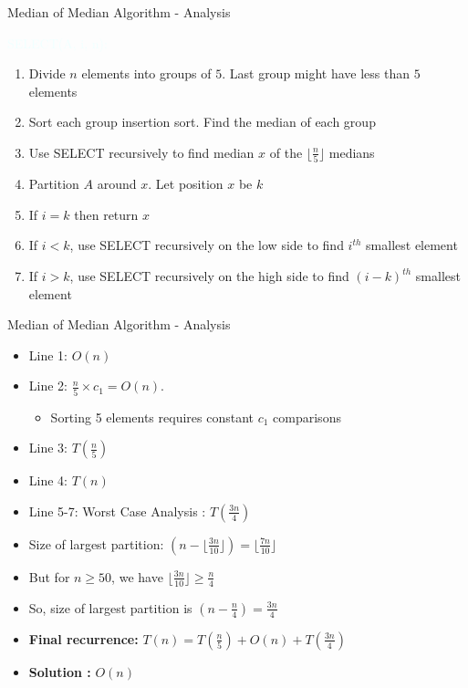\documentclass{beamer}
\newcommand{\tblue}[1]{{\Large {\textcolor{azure}{#1}}}}
\begin{document}
\begin{frame}{Median of Median Algorithm - Analysis}

\tblue{SELECT(A, i, n):}
\begin{enumerate}
    \item Divide $n$ elements into groups of $5$. Last group might have less than $5$ elements
    \item Sort each group insertion sort. Find the median of each group
    \item Use SELECT recursively to find median $x$ of the $\lfloor \frac{n}{5} \rfloor$ medians
    \item Partition $A$ around $x$. Let position $x$ be $k$ 
    \item If $i=k$ then return $x$
    \item If $i < k$, use SELECT recursively on the low side to find $i^{th}$ smallest element
    \item If $i > k$, use SELECT recursively on the high side to find $(i-k)^{th}$ smallest element 
\end{enumerate}

\end{frame}


\begin{frame}{Median of Median Algorithm - Analysis}
\begin{itemize}
    \item Line 1: \pause $O(n)$ 
    \item Line 2: \pause $\frac{n}{5} \times c_1 = O(n)$. 
    \begin{itemize}
        \item Sorting 5 elements requires constant $c_1$ comparisons 
    \end{itemize}
    \item Line 3: \pause $T(\frac{n}{5})$
    \item Line 4: \pause $T(n)$
    \item Line 5-7: \pause Worst Case Analysis : $T(\frac{3n}{4})$
    \item Size of largest partition: $(n - \lfloor \frac{3n}{10} \rfloor) =  \lfloor \frac{7n}{10} \rfloor$
    \item But for $n \geq 50$, we have $\lfloor \frac{3n}{10} \rfloor \geq \frac{n}{4}$
    \item So, size of largest partition is $(n - \frac{n}{4}) = \frac{3n}{4}$
    \item {\bf Final recurrence:} $T(n) = T(\frac{n}{5}) + O(n) + T(\frac{3n}{4})$
    \item {\bf Solution :} $O(n)$
\end{itemize}
\end{frame}
\end{document}
